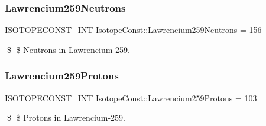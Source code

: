 \subsubsection{\texorpdfstring{Lawrencium259\+Neutrons}{Lawrencium259Neutrons}}
{\footnotesize\ttfamily \mbox{\hyperlink{group___isotope_const-_macros_ga5f18360b3e99483a35c32d789e62621c}{I\+S\+O\+T\+O\+P\+E\+C\+O\+N\+S\+T\+\_\+\+I\+NT}} Isotope\+Const\+::\+Lawrencium259\+Neutrons = 156}

\$ \$ Neutrons in Lawrencium-\/259. \mbox{\label{group___isotope_const-_lawrencium-_lr259_gabeeb05a5571ddce417ed84f495aa0942}} 
\subsubsection{\texorpdfstring{Lawrencium259\+Protons}{Lawrencium259Protons}}
{\footnotesize\ttfamily \mbox{\hyperlink{group___isotope_const-_macros_ga5f18360b3e99483a35c32d789e62621c}{I\+S\+O\+T\+O\+P\+E\+C\+O\+N\+S\+T\+\_\+\+I\+NT}} Isotope\+Const\+::\+Lawrencium259\+Protons = 103}

\$ \$ Protons in Lawrencium-\/259. 